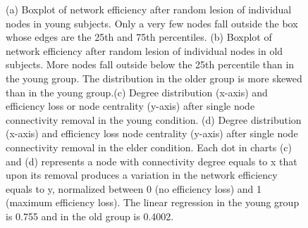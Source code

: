 \documentclass[12pt,a4paper]{article}
\begin{document}
\begin{figure}[H]
{    }
    \caption{\small (a) Boxplot of network efficiency after random lesion of individual nodes in young subjects. Only a very few nodes fall outside the box whose edges are the 25th and 75th percentiles. \small (b) Boxplot of network efficiency after random lesion of individual nodes  in old subjects. More nodes fall outside below the 25th percentile than in the young group. The distribution in the older group is more skewed than in the young group.\small (c) Degree distribution (x-axis) and efficiency loss or node centrality (y-axis) after single node connectivity removal in the young condition.  
  \small (d)  Degree distribution (x-axis) and efficiency loss node centrality (y-axis) after single node connectivity removal in the elder condition. Each dot in charts \small (c) and \small (d) represents a node with connectivity degree equals to x that upon its removal produces a variation in the network efficiency equals to y, normalized between 0 (no efficiency loss) and 1 (maximum efficiency loss). The linear regression in the young group is 0.755 and in the old group is 0.4002.}
    \label{fig:boxplot}
  \end{figure}
\end{document}
